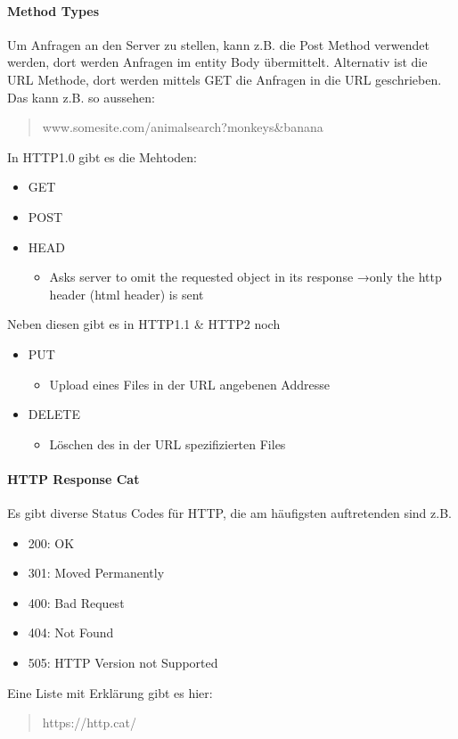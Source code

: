 		\paragraph{Method Types}
			Um Anfragen an den Server zu stellen, kann z.B. die Post Method verwendet werden, dort werden Anfragen im entity Body übermittelt. Alternativ ist die URL Methode, dort werden mittels GET die Anfragen in die URL geschrieben. Das kann z.B. so aussehen: 
			\begin{quote}
				www.somesite.com/animalsearch?monkeys\&banana
			\end{quote}
			In HTTP1.0 gibt es die Mehtoden:
			\begin{itemize}
				\item GET
				\item POST 
				\item HEAD 
					\begin{itemize}
						\item Asks server to omit the requested object in its response →only the http header (html header) is sent
					\end{itemize}
			\end{itemize}
			Neben diesen gibt es in HTTP1.1 \& HTTP2 noch
			\begin{itemize}
				\item PUT
					\begin{itemize}
						\item Upload eines Files in der URL angebenen Addresse
					\end{itemize}
				\item DELETE 
					\begin{itemize}
						\item Löschen des in der URL spezifizierten Files 
					\end{itemize}
			\end{itemize}

		\paragraph{HTTP Response Cat} 
			Es gibt diverse Status Codes für HTTP, die am häufigsten auftretenden sind z.B. 
			\begin{itemize}
				\item 200: OK 
				\item 301: Moved Permanently 
				\item 400: Bad Request 
				\item 404: Not Found 
				\item 505: HTTP Version not Supported 
			\end{itemize}
			Eine Liste mit Erklärung gibt es hier:
			\begin{quote}
				https://http.cat/
			\end{quote}

